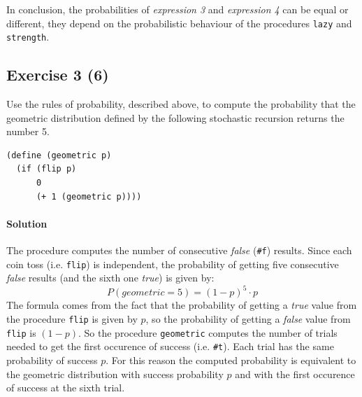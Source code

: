 \begin{itemize}
        In conclusion, the probabilities of \textit{expression 3} and \textit{expression 4} can be equal or different, they depend
        on the probabilistic behaviour of the procedures \texttt{lazy} and \texttt{strength}.
\end{itemize}

\subsection*{Exercise 3 (6)}
Use the rules of probability, described above, to compute the probability that the geometric distribution 
defined by the following stochastic recursion returns the number 5.

\begin{lstlisting}
(define (geometric p)
  (if (flip p)
      0
      (+ 1 (geometric p))))
\end{lstlisting}

\paragraph{Solution}
The procedure computes the number of consecutive \textit{false} (\texttt{\#f}) results. Since each coin toss (i.e. \texttt{flip}) is 
independent, the probability of getting five consecutive \textit{false} results (and the sixth one \textit{true}) is given by:
\[ P(geometric = 5) = (1 - p)^{5} \cdot p \]
The formula comes from the fact that the probability of getting a \textit{true} value from the procedure \texttt{flip} is given by
$p$, so the probability of getting a \textit{false} value from \texttt{flip} is $ (1 - p) $.
So the procedure \texttt{geometric} computes the number of trials needed to get the first occurence of success (i.e. \texttt{\#t}).
Each trial has the same probability of success $p$.
For this reason the computed probability is equivalent to the geometric distribution with success probability $p$ and with the 
first occurence of success at the sixth trial.

